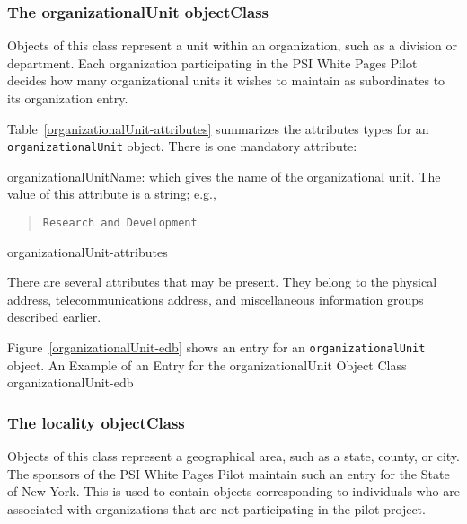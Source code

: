 \subsubsection	{The organizationalUnit objectClass}
Objects of this class represent a unit within an organization,
such as a division or department.
Each organization participating in the PSI White Pages Pilot decides
how many organizational units it wishes to maintain as subordinates to
its organization entry.

Table~\ref{organizationalUnit-attributes} summarizes the attributes types for
an \verb"organizationalUnit" object.
There is one mandatory attribute:
\begin{describe}
\item[organizationalUnitName:]
			which gives the name of the organizational unit.
			The value of this attribute is a string; e.g.,
\begin{quote}\small\begin{verbatim}
Research and Development
\end{verbatim}\end{quote}
\end{describe}
%
	{organizationalUnit-attributes}

There are several attributes that may be present.
They belong to the physical address, telecommunications address,
and miscellaneous information groups described earlier.

Figure~\ref{organizationalUnit-edb} shows an entry for an
\verb"organizationalUnit" object.
%
	{An Example of an Entry for the organizationalUnit Object Class}%
	{organizationalUnit-edb}

\subsubsection	{The locality objectClass}
Objects of this class represent a geographical area,
such as a state, county, or city.
The sponsors of the PSI White Pages Pilot maintain such an entry for
the State of New York.
This is used to contain objects corresponding to individuals who are
associated with organizations that are not participating in the pilot
project.


